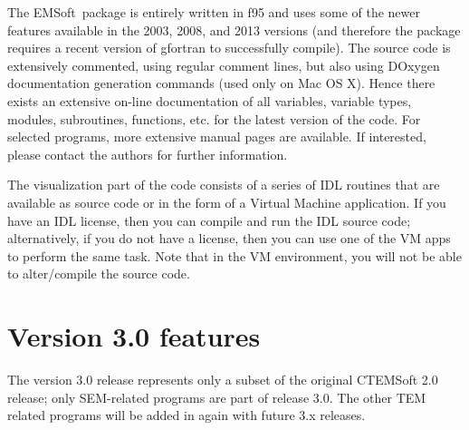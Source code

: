 \documentclass[DIV=calc, paper=letter, fontsize=11pt]{scrartcl}	 %
\newcommand{\ctp}{\textsf{EMSoft}}
\begin{document}
The \ctp\ package is entirely written in f95 and uses some of the newer features available in the 2003, 2008, and 2013 versions (and therefore the package 
requires a recent version of gfortran to successfully compile).
The source code is extensively commented, using regular comment lines, but also using DOxygen documentation generation commands (used only on Mac OS X).  Hence
there exists an extensive on-line documentation of all variables, variable types, modules, subroutines, functions, etc. for the latest version 
of the code.  For selected programs, more extensive manual pages are available.  If interested, please contact the authors for further information.

The visualization part of the code consists of a series of IDL routines that are available as source code or in the form of a Virtual Machine application. 
If you have an IDL license, then you can compile and run the IDL source code; alternatively, if you do not have a license,
then you can use one of the VM apps to perform the same task.  Note that in the VM environment, you will not be able to alter/compile the source code.
%

\newpage
\section{Version 3.0 features}
The version 3.0 release represents only a subset of the original CTEMSoft 2.0 release; only SEM-related programs are part of release 3.0.  The other TEM related programs 
will be added in again with future 3.x releases.
\end{document}
